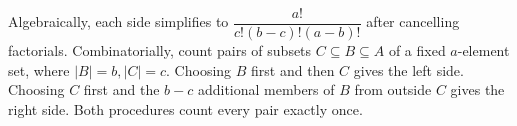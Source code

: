Algebraically, each side simplifies to $\dfrac{a!}{c!(b-c)!(a-b)!}$ after cancelling factorials.
Combinatorially, count pairs of subsets $C\subseteq B\subseteq A$ of a fixed $a$-element set, where $|B|=b,|C|=c$. Choosing $B$ first and then $C$ gives the left side. Choosing $C$ first and the $b-c$ additional members of $B$ from outside $C$ gives the right side. Both procedures count every pair exactly once.
